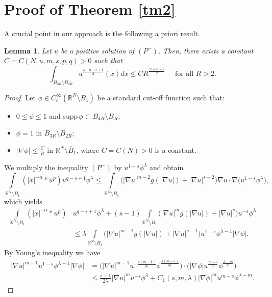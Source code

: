 \documentclass[leqno,12pt]{article}
\numberwithin{equation}{section}
\newcommand{\R}{\mathbb R}
\newcommand{\Ro}{\mathbb R^N\setminus \overline B_1}
\newtheorem{lemma}[theorem]{Lemma}
\begin{document}
\section{Proof of Theorem \ref{tm2}}

A crucial point in our approach is the following a priori result.
\begin{lemma}\label{lap}
Let $u$ be a positive solution of $(P^-)$. Then, there exists a constant $C=C(N,u,m,s,p,q)>0$ such that 
\begin{equation}\label{d20}
\int_{B_{3R}\setminus B_{2R}}u^{\frac{p+q-s+1}{2}}(x)dx \leq CR^{\frac{N+\alpha-s}{2}} \quad\mbox{ for all }R>2.
\end{equation}
\end{lemma}
\begin{proof}
Let $\phi\in C^\infty_c(\Ro)$ be a standard cut-off function such that:
\begin{itemize}
\item $0\leq \phi\leq 1$ and supp$\,\phi\subset B_{4R}\setminus B_{R}$;
\item  $\phi=1$ in $B_{3R}\setminus B_{2R}$;
\item  $|\nabla \phi|\leq \frac{C}{R}$ in $\Ro$, where $C=C(N)>0$ is a constant.
\end{itemize}
We multiply the inequality $(P^-)$ by $u^{1-s}\phi^\lambda$ and obtain
$$
\int\limits_{\R^N\setminus B_1}(|x|^{-\alpha}*u^p)u^{q-s+1}\phi^\lambda\leq \int\limits_{\R^N\setminus B_1}\Big(|\nabla u|^{m-2}g(|\nabla u|)+|\nabla u|^{s-2}\Big) \nabla u\cdot \nabla \big(u^{1-s}\phi^\lambda\big),
$$
which yields
\begin{equation}\label{d3}
\begin{aligned}
\int\limits_{\R^N\setminus B_1}(|x|^{-\alpha}*u^p)& u^{q-s+1}\phi^\lambda+(s-1) \int\limits_{\R^N\setminus B_1}\Big(|\nabla u|^{m}g(|\nabla u|)+|\nabla u|^{s}\Big) u^{-s}\phi^\lambda\\
&\leq \lambda \int\limits_{\R^N\setminus B_1}  \Big(|\nabla u|^{m-1}g(|\nabla u|)+|\nabla u|^{s-1}\Big) 
u^{1-s}\phi^{\lambda-1}|\nabla \phi|.
\end{aligned}
\end{equation}
By Young's inequality we have 
$$
\begin{aligned}
|\nabla u|^{m-1}u^{1-s}\phi^{\lambda-1}|\nabla \phi|&= \Big( |\nabla u|^{m-1} u^{-\frac{s(m-1)}{m}}\phi^{\frac{\lambda(m-1)}{m}}\Big)\cdot \Big(|\nabla \phi|u^{\frac{m-s}{m}}\phi^{\frac{\lambda-m}{m}}\Big)\\
&\leq \frac{s-1}{2\lambda}|\nabla u|^{m} u^{-s}\phi^\lambda+C_1(s,m,\lambda)|\nabla \phi|^{m} u^{m-s}\phi^{\lambda-m}.

\end{aligned}$$
\end{proof}
\end{document}
